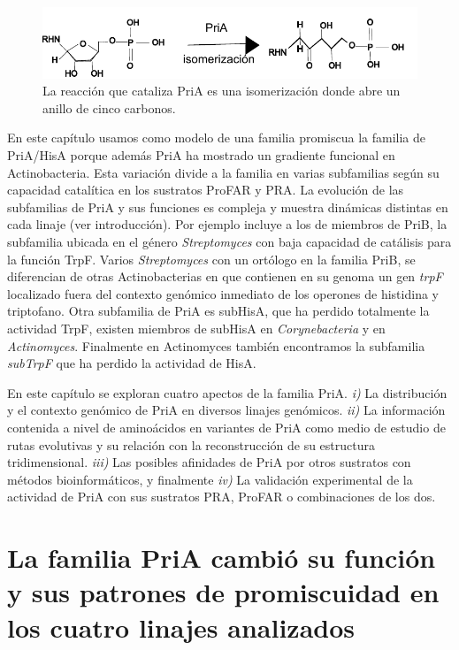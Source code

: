 \documentclass[12pt,twoside]{reedthesis}
\begin{document}
  \begin{figure}[h!tbp]
  \centering
  \includegraphics[angle = 0,scale = 1]{chapter4/isomerizacion.pdf}
  \caption[La reacción que cataliza PriA es una isomerización donde abre un anillo de cinco carbonos.]{\footnotesize{La reacción que cataliza PriA es una isomerización donde abre un anillo de cinco carbonos.}}
  \label{fig:isomerizacion}
  \end{figure}
  
  En este capítulo usamos como modelo de una familia promiscua la familia
  de PriA/HisA porque además PriA ha mostrado un gradiente funcional en
  Actinobacteria. Esta variación divide a la familia en varias subfamilias
  según su capacidad catalítica en los sustratos ProFAR y PRA. La
  evolución de las subfamilias de PriA y sus funciones es compleja y
  muestra dinámicas distintas en cada linaje (ver introducción). Por
  ejemplo incluye a los de miembros de PriB, la subfamilia ubicada en el
  género \emph{Streptomyces} con baja capacidad de catálisis para la
  función TrpF. Varios \emph{Streptomyces} con un ortólogo en la familia
  PriB, se diferencian de otras Actinobacterias en que contienen en su
  genoma un gen \emph{trpF} localizado fuera del contexto genómico
  inmediato de los operones de histidina y triptofano. Otra subfamilia de
  PriA es subHisA, que ha perdido totalmente la actividad TrpF, existen
  miembros de subHisA en \emph{Corynebacteria} y en \emph{Actinomyces}.
  Finalmente en Actinomyces también encontramos la subfamilia
  \emph{subTrpF} que ha perdido la actividad de HisA.
  
  En este capítulo se exploran cuatro apectos de la familia PriA.
  \emph{i)} La distribución y el contexto genómico de PriA en diversos
  linajes genómicos. \emph{ii)} La información contenida a nivel de
  aminoácidos en variantes de PriA como medio de estudio de rutas
  evolutivas y su relación con la reconstrucción de su estructura
  tridimensional. \emph{iii)} Las posibles afinidades de PriA por otros
  sustratos con métodos bioinformáticos, y finalmente \emph{iv)} La
  validación experimental de la actividad de PriA con sus sustratos PRA,
  ProFAR o combinaciones de los dos.
  
  \section{La familia PriA cambió su función y sus patrones de
  promiscuidad en los cuatro linajes
  analizados}\label{la-familia-pria-cambio-su-funcion-y-sus-patrones-de-promiscuidad-en-los-cuatro-linajes-analizados}
  
\end{document}
